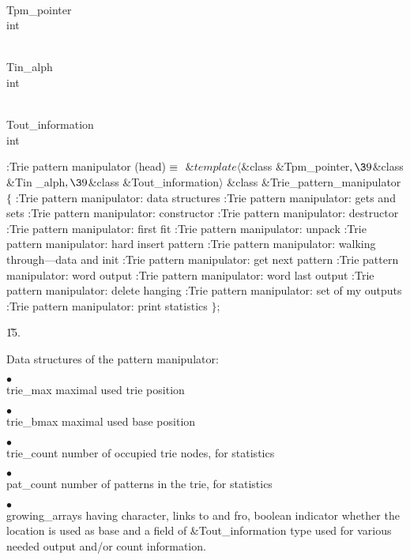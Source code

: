 \Y\B\F\\{Tpm\_pointer} \5
\\{int}\par
\B\F\\{Tin\_alph} \5
\\{int}\par
\B\F\\{Tout\_information} \5
\\{int}\par
\Y\B\4:Trie pattern manipulator (head)\X${}\equiv{}$\6
$\&{template}\langle{}$\&{class} \&{Tpm\_pointer}${},\39{}$\&{class} \&{Tin%
\_alph}${},\39{}$\&{class} \&{Tout\_information}${}\rangle{}$\6
\&{class} \&{Trie\_pattern\_manipulator} ${}\{{}$\1\6
:Trie pattern manipulator: data structures\X\6
:Trie pattern manipulator: gets and sets\X\7
:Trie pattern manipulator: constructor\X\6
:Trie pattern manipulator: destructor\X\7
:Trie pattern manipulator: first fit\X\6
:Trie pattern manipulator: unpack\X\7
:Trie pattern manipulator: hard insert pattern\X\6
:Trie pattern manipulator: walking through---data and init\X\6
:Trie pattern manipulator: get next pattern\X\6
:Trie pattern manipulator: word output\X\6
:Trie pattern manipulator: word last output\X\6
:Trie pattern manipulator: delete hanging\X\6
:Trie pattern manipulator: set of my outputs\X\6
:Trie pattern manipulator: print statistics\X\2\6
${}\}{}$;\par
\U15.\fi

Data structures of the pattern manipulator:

\item{$\bullet$} \\{trie\_max} maximal used trie position

\item{$\bullet$} \\{trie\_bmax} maximal used base position

\item{$\bullet$} \\{trie\_count} number of occupied trie nodes, for statistics

\item{$\bullet$} \\{pat\_count} number of patterns in the trie, for statistics

\item{$\bullet$} \\{growing\_array}s having character, links to and fro,
boolean indicator whether the location is used as base and a field of
\&{Tout\_information} type used for various needed output and/or count
information.

